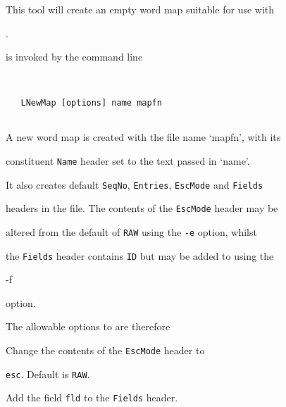 %




%





\newpage














This tool will create an empty word map suitable for use with


. 










 is invoked by the command line


\begin{verbatim}


   LNewMap [options] name mapfn


\end{verbatim}


A new word map is created with the file name `mapfn', with its


constituent {\tt Name} header set to the text passed in `name'.


It also creates default {\tt SeqNo}, {\tt Entries}, {\tt EscMode} and {\tt Fields}


headers in the file.  The contents of the {\tt EscMode} header may be


altered from the default of {\tt RAW} using the {\tt -e} option, whilst


the {\tt Fields} header contains {\tt ID} but may be added to using the {\tt


-f} option.





The allowable options to  are therefore


\begin{optlist}


   Change the contents of the {\tt EscMode} header to


      {\tt esc}. Default is {\tt RAW}.





   Add the field {\tt fld} to the {\tt Fields} header.





\end{optlist}


